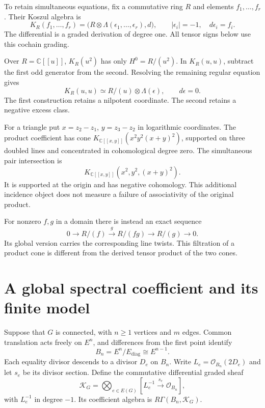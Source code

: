 To retain simultaneous equations, fix a commutative ring $R$ and
elements $f_1,\ldots,f_r$. Their Koszul algebra is
\begin{equation}\label{ei:eq:koszul}
 K_R(f_1,\ldots,f_r)
  =\bigl(R\otimes\Lambda(\epsilon_1,\ldots,\epsilon_r),d\bigr),
 \qquad |\epsilon_i|=-1,\quad d\epsilon_i=f_i.
\end{equation}
The differential is a graded derivation of degree one.
All tensor signs below use this cochain grading.

Over $R=\mathbb C[[u]]$, $K_R(u^2)$ has only
$H^0=R/(u^2)$. In $K_R(u,u)$, subtract the first odd generator
from the second. Resolving the remaining regular equation gives
\[
 K_R(u,u)\simeq R/(u)\otimes\Lambda(\epsilon),\qquad d\epsilon=0.
\]
The first construction retains a nilpotent coordinate.
The second retains a negative excess class.

For a triangle put $x=z_2-z_1$, $y=z_3-z_2$ in logarithmic
coordinates. The product coefficient has cone
$K_{\mathbb C[[x,y]]}(x^2y^2(x+y)^2)$, supported on three doubled
lines and concentrated in cohomological degree zero.
The simultaneous pair intersection is
\begin{equation}\label{ei:eq:triangle-koszul}
 K_{\mathbb C[[x,y]]}(x^2,y^2,(x+y)^2).
\end{equation}
It is supported at the origin and has negative cohomology.
This additional incidence object does not measure a failure of
associativity of the original product.

For nonzero $f,g$ in a domain there is instead an exact sequence
\[
 0\longrightarrow R/(f)\xrightarrow{g}R/(fg)
   \longrightarrow R/(g)\longrightarrow0.
\]
Its global version carries the corresponding line twists.
This filtration of a product cone is different from the derived
tensor product of the two cones.

\section{A global spectral coefficient and its finite model}
\label{ei:sec:graph}

Suppose that $G$ is connected, with $n\geq1$ vertices and $m$ edges.
Common translation acts freely on $E^n$, and differences from the
first point identify
\[
 B_n=E^n/E_{\mathrm{diag}}\cong E^{n-1}.
\]
Each equality divisor descends to a divisor $D_e$ on $B_n$.
Write $L_e=\mathcal O_{B_n}(2D_e)$ and let $s_e$ be its divisor
section. Define the commutative differential graded sheaf
\begin{equation}\label{ei:eq:global-koszul}
 \mathscr K_G=\bigotimes_{e\in E(G)}
       [L_e^{-1}\xrightarrow{s_e}\mathcal O_{B_n}],
\end{equation}
with $L_e^{-1}$ in degree $-1$.
Its coefficient algebra is $R\Gamma(B_n,\mathscr K_G)$.

